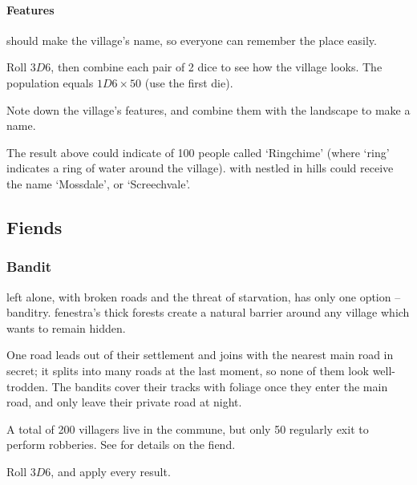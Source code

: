 \begin{multicols}{2}
\paragraph{ Features}
\label{villageFeatures}
should make the \gls{village}'s name, so everyone can remember the place easily.

Roll $3D6$, then combine each pair of 2 dice to see how the \gls{village} looks.
The population equals $1D6 \times 50$ (use the first die).

\encVillageFeatures

Note down the \gls{village}'s features, and combine them with the landscape to make a name.


The result above could indicate  of 100 people called `Ringchime' (where `ring' indicates a ring of water around the \gls{village}).
 with  nestled in hills could receive the name `Mossdale', or `Screechvale'.

\subsection{Fiends}
\label{mapFiends}

\subsubsection{Bandit }
\label{banditsPoint}

 left alone, with broken roads and the threat of starvation, has only one option -- banditry.
\Gls{fenestra}'s thick forests create a natural barrier around any \gls{village} which wants to remain hidden.

One road leads out of their settlement and joins with the nearest main road in secret; it splits into many roads at the last moment, so none of them look well-trodden.
The bandits cover their tracks with foliage once they enter the main road, and only leave their private road at night.

A total of 200 villagers live in the commune, but only 50 regularly exit to perform robberies.
See  for details on the \gls{fiend}.

Roll $3D6$, and apply every result.


\end{multicols}
